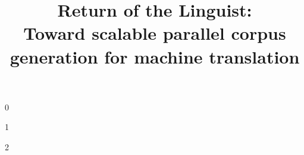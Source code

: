
\def\buildemnlp{0}
\def\buildamta{1}
\def\buildhcomp{2}
\def\buildtarget{\buildamta} %

\title{Return of the Linguist:\\Toward scalable parallel corpus generation for machine translation}

\if \buildtarget \buildemnlp    
    
    \newcommand\mycitep[1]{\cite{#1}}     %
    \newcommand\mynewcite[1]{\newcite{#1}}
    \newcommand\amtaonly[1]{} %
    \newcommand\emnlponly[1]{#1}
    \newcommand\hcomponly[1]{}
\fi
\if \buildtarget \buildamta    
    
    \newcommand\mycitep[1]{\citep{#1}} 
    \newcommand\mynewcite[1]{\cite{#1}}  
    \newcommand\amtaonly[1]{#1}
    \newcommand\emnlponly[1]{}
    \newcommand\hcomponly[1]{}
    
    \usepackage{amstext}
    \usepackage{multirow}
    
    \usepackage{graphicx}

\fi
\if \buildtarget \buildhcomp    
    
    \newcommand\mycitep[1]{\cite{#1}} 
    \newcommand\mynewcite[1]{\citeauthor{#1}~\shortcite{#1}}  
    \newcommand\amtaonly[1]{}
    \newcommand\emnlponly[1]{}
    \newcommand\hcomponly[1]{#1}
\fi
    
\usepackage{CJK}
\usepackage[utf8]{inputenc}
\newcommand\zh[1]{\begin{CJK}{UTF8}{gbsn}#1\end{CJK}}






